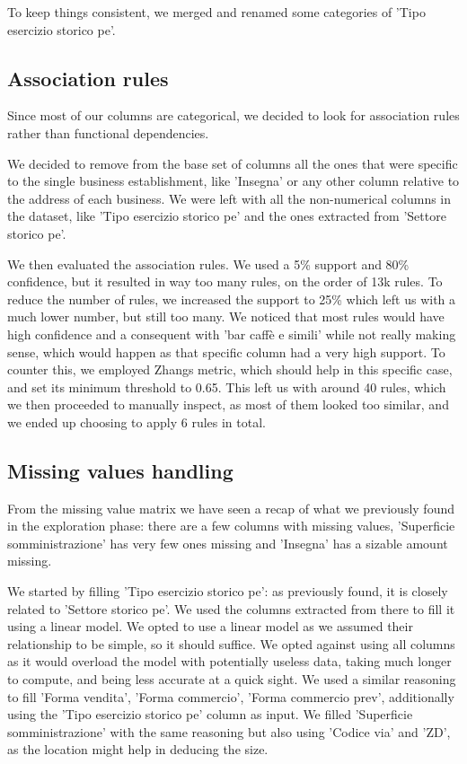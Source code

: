 \documentclass{article}
\begin{document}
To keep things consistent, we merged and renamed some categories of 'Tipo esercizio storico pe'.

\subsection{Association rules}
Since most of our columns are categorical, we decided to look for association rules rather than functional dependencies.

We decided to remove from the base set of columns all the ones that were specific to the single business establishment, like 'Insegna' or any other column relative to the address of each business. We were left with all the non-numerical columns in the dataset, like 'Tipo esercizio storico pe' and the ones extracted from 'Settore storico pe'. 

We then evaluated the association rules. We used a 5\% support and 80\% confidence, but it resulted in way too many rules, on the order of 13k rules. To reduce the number of rules, we increased the support to 25\% which left us with a much lower number, but still too many. We noticed that most rules would have high confidence and a consequent with 'bar caffè e simili' while not really making sense, which would happen as that specific column had a very high support. To counter this, we employed Zhangs metric, which should help in this specific case, and set its minimum threshold to 0.65. This left us with around 40 rules, which we then proceeded to manually inspect, as most of them looked too similar, and we ended up choosing to apply 6 rules in total.

\subsection{Missing values handling}
From the missing value matrix we have seen a recap of what we previously found in the exploration phase: there are a few columns with missing values, 'Superficie somministrazione' has very few ones missing and 'Insegna' has a sizable amount missing.

We started by filling 'Tipo esercizio storico pe': as previously found, it is closely related to 'Settore storico pe'. We used the columns extracted from there to fill it using a linear model. We opted to use a linear model as we assumed their relationship to be simple, so it should suffice. We opted against using all columns as it would overload the model with potentially useless data, taking much longer to compute, and being less accurate at a quick sight. We used a similar reasoning to fill 'Forma vendita', 'Forma commercio', 'Forma commercio prev', additionally using the 'Tipo esercizio storico pe' column as input. We filled 'Superficie somministrazione' with the same reasoning but also using 'Codice via' and 'ZD', as the location might help in deducing the size.
\end{document}
